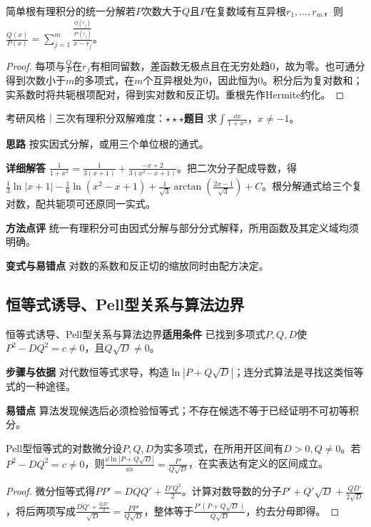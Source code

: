 \begin{theorem}{简单根有理积分的统一分解}若$P$次数大于$Q$且$P$在复数域有互异根$r_1,\ldots,r_m$，则$\frac{Q(x)}{P(x)}=\sum_{j=1}^m\frac{\frac{Q(r_j)}{P'(r_j)}}{x-r_j}$。\end{theorem}\begin{proof}每项与$\frac{Q}{P}$在$r_j$有相同留数，差函数无极点且在无穷处趋0，故为零。也可通分得到次数小于$m$的多项式，在$m$个互异根处为0，因此恒为0。积分后为复对数和；实系数时将共轭根项配对，得到实对数和反正切。重根先作Hermite约化。\end{proof}

\begin{example}{考研风格｜三次有理积分双解}{难度：$\star\star\star$}\label{deep:ex:integral_source_deep:cubic}\textbf{题目} 求$\int\frac{\dd x}{1+x^3}$，$x\ne-1$。\par\textbf{思路} 按实因式分解，或用三个单位根的通式。\par\textbf{详细解答} $\frac{1}{1+x^3}=\frac{1}{3(x+1)}+\frac{-x+2}{3(x^2-x+1)}$。把二次分子配成导数，得$\frac13\ln|x+1|-\frac16\ln(x^2-x+1)+\frac1{\sqrt3}\arctan(\frac{2x-1}{\sqrt3})+C$。根分解通式给三个复对数，配共轭项可还原同一实式。\par\textbf{方法点评} 统一有理积分可由因式分解与部分分式解释，所用函数及其定义域均须明确。\par\textbf{变式与易错点} 对数的系数和反正切的缩放同时由配方决定。\end{example}

\subsection{恒等式诱导、Pell型关系与算法边界}\label{deep:integral_source_deep:pell}

\begin{method}{恒等式诱导、Pell型关系与算法边界}\textbf{适用条件} 已找到多项式$P,Q,D$使$P^2-DQ^2=c\ne0$，且$Q\sqrt D\ne0$。\par\textbf{步骤与依据} 对代数恒等式求导，构造$\ln|P+Q\sqrt D|$；连分式算法是寻找这类恒等式的一种途径。\par\textbf{易错点} 算法发现候选后必须检验恒等式；不存在候选不等于已经证明不可初等积分。\end{method}

\begin{theorem}{Pell型恒等式的对数微分}设$P,Q,D$为实多项式，在所用开区间有$D>0,Q\ne0$。若$P^2-DQ^2=c\ne0$，则$\frac{\dd\ln|P+Q\sqrt D|}{\dd x}=\frac{P'}{Q\sqrt D}$，在实表达有定义的区间成立。\end{theorem}\begin{proof}微分恒等式得$PP'=DQQ'+\frac{D'Q^2}{2}$。计算对数导数的分子$P'+Q'\sqrt D+\frac{QD'}{2\sqrt D}$，将后两项写成$\frac{DQ'+\frac{QD'}{2}}{\sqrt D}=\frac{PP'}{Q\sqrt D}$，整体等于$\frac{P'(P+Q\sqrt D)}{Q\sqrt D}$，约去分母即得。\end{proof}

